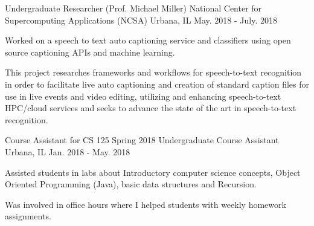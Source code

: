 \vspace*{-0.25cm}
\vspace*{-0.25cm}
\begin{cventries}
  
  \cventry
    {Undergraduate Researcher (Prof. Michael Miller)}
    {National Center for Supercomputing Applications (NCSA) }
    {Urbana, IL}
    {May. 2018 - July. 2018}
    {
      \begin{cvitems}
        \item {Worked on a speech to text auto captioning service and classifiers using open source captioning APIs and machine learning.}
        \item {This project researches frameworks and workflows for speech-to-text recognition in order to facilitate live auto captioning and creation of standard caption files for use in live events and video editing, utilizing and enhancing speech-to-text HPC/cloud services and seeks to advance the state of the art in speech-to-text recognition.}
      \end{cvitems}
      \vspace*{-0.25cm}
    }
    
  \cventry
    {Course Assistant for CS 125 Spring 2018}
    {Undergraduate Course Assistant}
    {Urbana, IL}
    {Jan. 2018 - May. 2018}
    {
      \begin{cvitems}
        \item {Assisted students in labs about Introductory computer science concepts, Object Oriented Programming (Java), basic data structures and Recursion.}
        \item {Was involved in office hours where I helped students with weekly homework assignments.}
      \end{cvitems}
    }
    
\end{cventries}
\vspace*{0.15cm}
\vspace*{-0.25cm}
